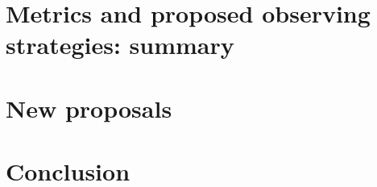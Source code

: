 \documentclass [11pt,a4paper]{article}
\begin{document}












\section{Metrics and proposed observing strategies: summary}
 


\section{New proposals}



\section{Conclusion}




\begin{comment}
\begin{thebibliography}{9}
\expandafter\ifx\csname natexlab\endcsname\relax\def\natexlab#1{#1}\fi
\providecommand{\url}[1]{\href{#1}{#1}}
\providecommand{\dodoi}[1]{doi:~\href{http://doi.org/#1}{\nolinkurl{#1}}}
\providecommand{\doeprint}[1]{\href{http://ascl.net/#1}{\nolinkurl{http://ascl.net/#1}}}
\providecommand{\doarXiv}[1]{\href{https://arxiv.org/abs/#1}{\nolinkurl{https://arxiv.org/abs/#1}}}


\bibitem{perrett} Evolution in the Volumetric Type Ia Supernova Rate from the Supernova Legacy Survey, K.Perrett {\it et al}, The Astronomical Journal, Volume 144, Issue 2 (2012).

\bibitem[Davis et al.(2011)]{2011ApJ...741...67D} Davis, T.~M., Hui, L., Frieman, J.~A., et al.\ 2011, \apj, 741, 67.  
\bibitem[Hui, \& Greene(2006)]{2006PhRvD..73l3526H} Hui, L., \& Greene, P.~B.\ 2006, \prd, 73, 123526.
  
\bibitem[Howlett et al.(2017)]{2017ApJ...847..128H} Howlett, C., Robotham, A.~S.~G., Lagos, C.~D.~P., et al.\ 2017, \apj, 847, 128.

  
  
 \end{thebibliography}
\end{comment}

\clearpage


\appendix
  


\end{document}
